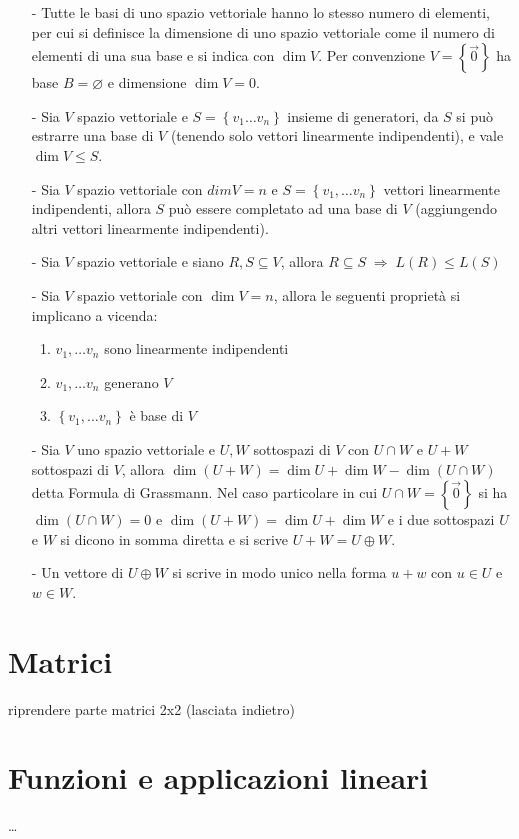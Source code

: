 \documentclass[a4paper]{article}
\begin{document}
\begin{itemize}
	\item[-] Tutte le basi di uno spazio vettoriale hanno lo stesso numero di elementi, per cui si definisce la dimensione di uno
	spazio vettoriale come il numero di elementi di una sua base e si indica con \(\dim V\). Per convenzione \(V = \left\{ \vec{0} \right\}\)
	ha base \(B = \varnothing\) e dimensione \(\dim V = 0\).
	
	\item[-] Sia \(V\) spazio vettoriale e \(S = \left\{ v_1 \dots v_n \right\}\) insieme di generatori, da \(S\) si può estrarre
	una base di \(V\) (tenendo solo vettori linearmente indipendenti), e vale \(\dim V \leq S\).
	
	\item[-] Sia \(V\) spazio vettoriale con \(dim V = n\) e \(S = \left\{ v_1, \dots v_n \right\}\) vettori linearmente indipendenti,
	allora \(S\) può essere completato ad una base di \(V\) (aggiungendo altri vettori linearmente indipendenti).
	
	\item[-] Sia \(V\) spazio vettoriale e siano \(R,S \subseteq V\), allora \(R \subseteq S \; \Rightarrow \; L(R) \leq L(S)\)
	
	\item[-] Sia \(V\) spazio vettoriale con \(\dim V = n\), allora le seguenti proprietà si implicano a vicenda:
	\begin{enumerate}
		\item \(v_1, \dots v_n\) sono linearmente indipendenti
		\item \(v_1, \dots v_n\) generano \(V\)
		\item \(\left\{ v_1, \dots v_n \right\}\) è base di \(V\)
	\end{enumerate}
	
	\item[-] Sia \(V\) uno spazio vettoriale e \(U, W\) sottospazi di \(V\) con \(U \cap W\) e \(U + W\) sottospazi di \(V\), allora
	\(\dim (U + W) = \dim U + \dim W - \dim (U \cap W)\) detta Formula di Grassmann. Nel caso particolare in cui \(U \cap W = \left\{ \vec{0} \right\}\)
	si ha \(\dim (U \cap W) = 0\) e \(\dim (U + W) = \dim U + \dim W\) e i due sottospazi \(U\) e \(W\) si dicono in somma diretta
	e si scrive \(U + W = U \oplus W\).

	\item[-] Un vettore di \(U \oplus W\) si scrive in modo unico nella forma \(u + w\) con \(u \in U\) e \(w \in W\).
\end{itemize}

\newpage


\section{Matrici}
riprendere parte matrici 2x2 (lasciata indietro)

\section{Funzioni e applicazioni lineari}
\dots
\end{document}

